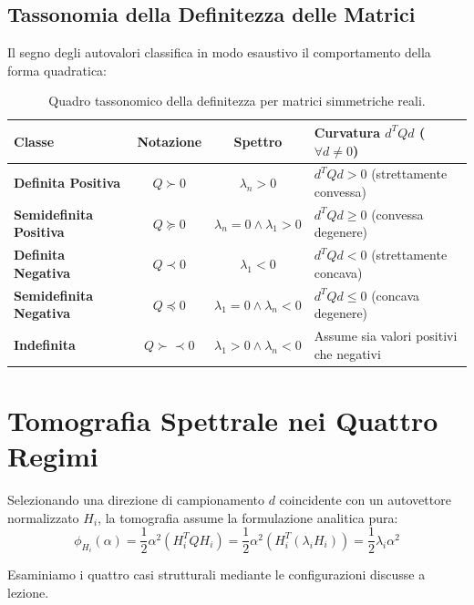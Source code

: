 \subsection{Tassonomia della Definitezza delle Matrici}
Il segno degli autovalori classifica in modo esaustivo il comportamento della forma quadratica:

\begin{table}[H]
\centering
\small
\renewcommand{\arraystretch}{1.3}
\begin{tabularx}{\textwidth}{l c c X}
\toprule
\textbf{Classe} & \textbf{Notazione} & \textbf{Spettro} & \textbf{Curvatura $d^T Q d$ ($\forall d \neq 0$)} \\
\midrule
\textbf{Definita Positiva} & $Q \succ 0$ & $\lambda_n > 0$ & $d^T Q d > 0$ (strettamente convessa) \\
\textbf{Semidefinita Positiva} & $Q \succeq 0$ & $\lambda_n = 0 \land \lambda_1 > 0$ & $d^T Q d \ge 0$ (convessa degenere) \\
\textbf{Definita Negativa} & $Q \prec 0$ & $\lambda_1 < 0$ & $d^T Q d < 0$ (strettamente concava) \\
\textbf{Semidefinita Negativa} & $Q \preceq 0$ & $\lambda_1 = 0 \land \lambda_n < 0$ & $d^T Q d \le 0$ (concava degenere) \\
\textbf{Indefinita} & $Q \succ\prec 0$ & $\lambda_1 > 0 \land \lambda_n < 0$ & Assume sia valori positivi che negativi \\
\bottomrule
\end{tabularx}
\caption{Quadro tassonomico della definitezza per matrici simmetriche reali.}
\label{tab:definitezza-matrici}
\end{table}


\FloatBarrier
\section{Tomografia Spettrale nei Quattro Regimi}
\label{sec:opt-tomografia-quattro-regimi}

Selezionando una direzione di campionamento $d$ coincidente con un autovettore normalizzato $H_i$, la tomografia assume la formulazione analitica pura:
\begin{equation}
\phi_{H_i}(\alpha) = \frac{1}{2} \alpha^2 (H_i^T Q H_i) = \frac{1}{2} \alpha^2 (H_i^T (\lambda_i H_i)) = \frac{1}{2} \lambda_i \alpha^2
\end{equation}

Esaminiamo i quattro casi strutturali mediante le configurazioni discusse a lezione.

